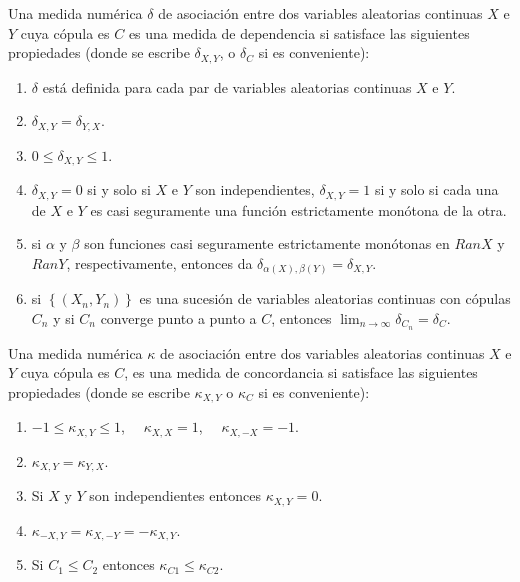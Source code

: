 \begin{defn}
    Una medida numérica $\delta$ de asociación entre dos variables aleatorias continuas $X$ e $Y$ cuya cópula es $C$ es una medida de dependencia si satisface las siguientes propiedades (donde se escribe $\delta_{X,Y}$, o $\delta_C$ si es conveniente):

    \begin{enumerate}
        \item $\delta$ está definida para cada par de variables aleatorias continuas $X$ e $Y$.
        \item $\delta_{X,Y} = \delta_{Y,X}$.
        
        \item $0 \leq \delta_ {X,Y} \leq 1$.
        
        \item  $\delta_{X,Y} = 0$ si y solo si $X$ e $Y$ son independientes, $\delta_{X,Y} = 1$ si y solo si cada una de $X$ e $Y$ es casi seguramente una función estrictamente monótona de la otra.
        
        \item si $\alpha$ y $\beta$ son funciones casi seguramente estrictamente monótonas en $RanX$ y $RanY$, respectivamente, entonces da $\delta_{\alpha(X), \beta(Y)} = \delta_{X,Y}$.
        
        \item si $\left\{ ( X_n, Y_n )\right\}$ es una sucesión de variables aleatorias continuas con cópulas $C_n$ y si $ C_n$ converge punto a punto a $C$, entonces $\lim_{n \to \infty} \delta_{C_n} = \delta_C$.
    \end{enumerate}
\end{defn}

\begin{defn}
    Una medida numérica $\kappa$ de asociación entre dos variables aleatorias continuas $X$ e $Y$ cuya cópula es $C$, es una medida de concordancia si satisface las siguientes propiedades (donde se escribe $\kappa_{X,Y}$ o $\kappa_{C}$ si es conveniente):

    \begin{enumerate}
        \item $-1 \leq \kappa_{X,Y} \leq 1$, $\quad \kappa_{X,X} = 1$, $\quad \kappa_{X,-X} = -1$.

        \item $\kappa_{X,Y} = \kappa_{Y,X}$.

        \item Si $X$ y $Y$ son independientes entonces $\kappa_{X,Y} = 0$.

        \item $\kappa_{-X,Y} = \kappa_{X,-Y} = -\kappa_{X,Y}$.
        \item Si $C_1 \leq C_2$ entonces $\kappa_{C1} \leq \kappa_{C2}$.
    \end{enumerate}
\end{defn}

